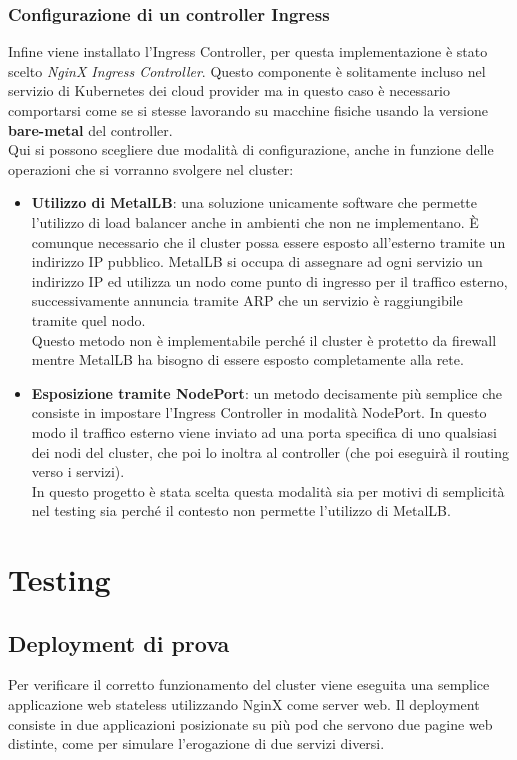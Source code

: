 \documentclass[12pt,a4paper,openright,twoside]{book}
\begin{document}
\subsection{Configurazione di un controller Ingress}
\label{sec:ingress}
Infine viene installato l'Ingress Controller, per questa implementazione è stato scelto \textit{NginX Ingress Controller}. Questo componente è solitamente
incluso nel servizio di Kubernetes dei cloud provider ma in questo caso è necessario comportarsi come se si stesse lavorando su macchine fisiche usando la 
versione \textbf{bare-metal} del controller.\\
Qui si possono scegliere due modalità di configurazione, anche in funzione delle operazioni che si vorranno svolgere nel cluster\cite{nginx-ingress-controller}:
\begin{itemize}
    \item \textbf{Utilizzo di MetalLB}: una soluzione unicamente software che permette l'utilizzo di load balancer anche in ambienti che non ne implementano.
        È comunque necessario che il cluster possa essere esposto all'esterno tramite un indirizzo IP pubblico. MetalLB si occupa di assegnare ad ogni servizio un
        indirizzo IP ed utilizza un nodo come punto di ingresso per il traffico esterno, successivamente annuncia tramite ARP che un servizio è raggiungibile tramite 
        quel nodo.\\
        Questo metodo non è implementabile perché il cluster è protetto da firewall mentre MetalLB ha bisogno di essere esposto completamente alla rete.
    \item {\textbf{Esposizione tramite NodePort}: un metodo decisamente più semplice che consiste in impostare l'Ingress Controller in modalità NodePort.
        In questo modo il traffico esterno viene inviato ad una porta specifica di uno qualsiasi dei nodi del cluster, che poi lo inoltra al controller (che poi
        eseguirà il routing verso i servizi).\\
        In questo progetto è stata scelta questa modalità sia per motivi di semplicità nel testing sia perché il contesto non permette l'utilizzo di MetalLB.
    }
\end{itemize} 
\chapter{Testing}
\section{Deployment di prova}
\label{sec:test-depl}
Per verificare il corretto funzionamento del cluster viene eseguita una semplice applicazione web stateless utilizzando NginX come server web. Il deployment consiste in due applicazioni
posizionate su più pod che servono due pagine web distinte, come per simulare l'erogazione di due servizi diversi.
\end{document}
